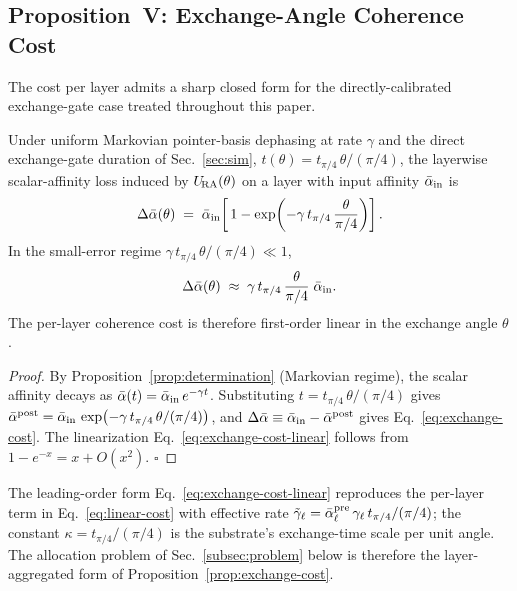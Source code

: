 \subsection{Proposition~V: Exchange-Angle Coherence Cost}
\label{subsec:prop5}

The cost per layer admits a sharp closed form for the
directly-calibrated exchange-gate case treated throughout this paper.

\begin{proposition}
\label{prop:exchange-cost}
Under uniform Markovian pointer-basis dephasing at rate $\gamma$ and the
direct exchange-gate duration of Sec.~\ref{sec:sim},
$t(\theta) = t_{\pi/4}\,\theta/(\pi/4)$, the layerwise scalar-affinity loss induced by
$U_{\!\mathrm{RA}}(\theta)$ on a layer with input affinity $\bar\alpha_{\rm in}$ is
%
\begin{equation}
\label{eq:exchange-cost}
\Delta\bar\alpha(\theta)
  \;=\; \bar\alpha_{\rm in}\!\left[\,
        1 - \exp\!\left(-\gamma\,t_{\pi/4}\,\frac{\theta}{\pi/4}\right)\right].
\end{equation}
%
In the small-error regime $\gamma\, t_{\pi/4}\,\theta/(\pi/4) \ll 1$,
%
\begin{equation}
\label{eq:exchange-cost-linear}
\Delta\bar\alpha(\theta)
  \;\approx\; \gamma\,t_{\pi/4}\,\frac{\theta}{\pi/4}\;\bar\alpha_{\rm in}.
\end{equation}
%
The per-layer coherence cost is therefore first-order linear in the
exchange angle $\theta$.
\end{proposition}

\begin{proof}
By Proposition~\ref{prop:determination} (Markovian regime), the scalar
affinity decays as
$\bar\alpha(t) = \bar\alpha_{\rm in}\,e^{-\gamma t}$.
Substituting $t = t_{\pi/4}\,\theta/(\pi/4)$ gives
$\bar\alpha^{\rm post} = \bar\alpha_{\rm in}\,\exp(-\gamma\,t_{\pi/4}\,\theta/(\pi/4))$,
and $\Delta\bar\alpha \equiv \bar\alpha_{\rm in} - \bar\alpha^{\rm post}$
gives Eq.~\eqref{eq:exchange-cost}.
The linearization Eq.~\eqref{eq:exchange-cost-linear} follows from
$1 - e^{-x} = x + O(x^2)$. $\square$
\end{proof}

\begin{remark}
The leading-order form Eq.~\eqref{eq:exchange-cost-linear} reproduces
the per-layer term in Eq.~\eqref{eq:linear-cost} with effective rate
$\tilde\gamma_\ell = \bar\alpha_\ell^{\rm pre}\,\gamma_\ell\,t_{\pi/4}/(\pi/4)$;
the constant $\kappa = t_{\pi/4}/(\pi/4)$ is the substrate's
exchange-time scale per unit angle.
The allocation problem of Sec.~\ref{subsec:problem} below is therefore
the layer-aggregated form of
Proposition~\ref{prop:exchange-cost}.
\end{remark}

